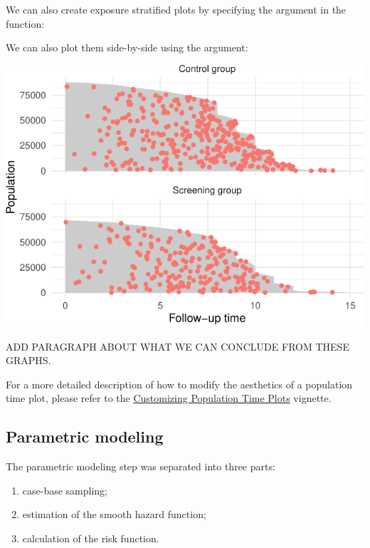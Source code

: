 \documentclass[
]{jss}
\providecommand{\tightlist}{%
  \setlength{\itemsep}{0pt}\setlength{\parskip}{0pt}}
\begin{document}
We can also create exposure stratified plots by specifying the
 argument in the  function:

We can also plot them side-by-side using the  argument:

\begin{CodeChunk}


\begin{center}\includegraphics{../figures/plot-stratified-erspc-data-side-1} \end{center}

\end{CodeChunk}

ADD PARAGRAPH ABOUT WHAT WE CAN CONCLUDE FROM THESE GRAPHS.

For a more detailed description of how to modify the aesthetics of a
population time plot, please refer to the
\href{http://sahirbhatnagar.com/casebase/articles/customizingpopTime.html}{Customizing
Population Time Plots} vignette.

\hypertarget{parametric-modeling}{%
\subsection{Parametric modeling}\label{parametric-modeling}}

The parametric modeling step was separated into three parts:

\begin{enumerate}
\def\labelenumi{\arabic{enumi}.}
\tightlist
\item
  case-base sampling;
\item
  estimation of the smooth hazard function;
\item
  calculation of the risk function.
\end{enumerate}
\end{document}
